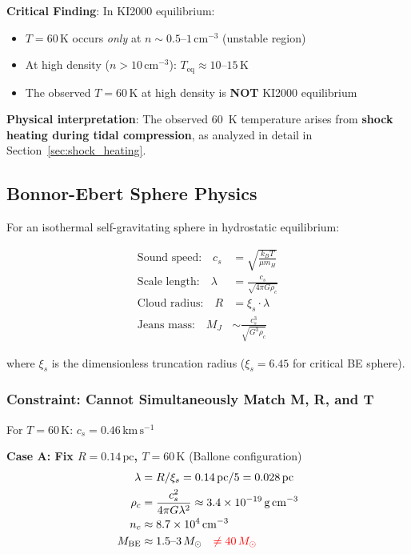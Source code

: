 \documentclass[11pt,a4paper]{article}
\newcommand{\Msun}{M_\odot}
\newcommand{\kms}{\,\mathrm{km\,s^{-1}}}
\newcommand{\pc}{\,\mathrm{pc}}
\newcommand{\cmcubed}{\,\mathrm{cm^{-3}}}
\begin{document}
\textbf{Critical Finding}: In KI2000 equilibrium:
\begin{itemize}
    \item $T = 60\,\mathrm{K}$ occurs \textit{only} at $n \sim 0.5$--$1\cmcubed$ (unstable region)
    \item At high density ($n > 10\cmcubed$): $T_\mathrm{eq} \approx 10$--$15\,\mathrm{K}$
    \item The observed $T = 60\,\mathrm{K}$ at high density is \textbf{NOT} KI2000 equilibrium
\end{itemize}

\textbf{Physical interpretation}: The observed 60~K temperature arises from
\textbf{shock heating during tidal compression}, as analyzed in detail in Section~\ref{sec:shock_heating}.

\subsection{Bonnor-Ebert Sphere Physics}

For an isothermal self-gravitating sphere in hydrostatic equilibrium:

\begin{align}
    \text{Sound speed:} \quad c_s &= \sqrt{\frac{k_B T}{\mu m_H}} \\
    \text{Scale length:} \quad \lambda &= \frac{c_s}{\sqrt{4\pi G \rho_c}} \\
    \text{Cloud radius:} \quad R &= \xi_s \cdot \lambda \\
    \text{Jeans mass:} \quad M_J &\sim \frac{c_s^3}{\sqrt{G^3 \rho_c}}
\end{align}

where $\xi_s$ is the dimensionless truncation radius ($\xi_s = 6.45$ for critical BE sphere).

\subsubsection{Constraint: Cannot Simultaneously Match M, R, and T}

For $T = 60\,\mathrm{K}$: $c_s = 0.46\kms$

\textbf{Case A: Fix $R = 0.14\pc$, $T = 60\,\mathrm{K}$} (Ballone configuration)
\begin{align}
    \lambda &= R/\xi_s = 0.14\pc / 5 = 0.028\pc \\
    \rho_c &= \frac{c_s^2}{4\pi G \lambda^2} \approx 3.4 \times 10^{-19}\,\mathrm{g\,cm^{-3}} \\
    n_c &\approx 8.7 \times 10^4\cmcubed \\
    M_\mathrm{BE} &\approx 1.5\text{--}3\,\Msun \quad \textcolor{red}{\neq 40\,\Msun}
\end{align}
\end{document}
